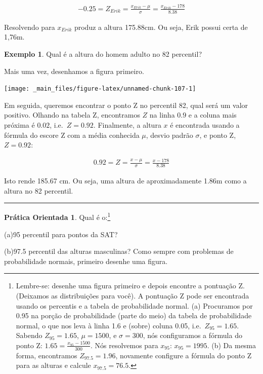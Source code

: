 \documentclass[
]{book}
\theoremstyle{definition}
\theoremstyle{definition}
\newtheorem{example}{Exemplo}[chapter]
\theoremstyle{definition}
\newtheorem{exercise}{Prática Orientada}[chapter]
\theoremstyle{definition}
\theoremstyle{remark}
\begin{document}
\begin{eqnarray*}
-0.25 = Z_{Erik} = \frac{x_{Erik} - \mu}{\sigma} = \frac{x_{Erik} - 178}{8.38}
\end{eqnarray*}

Resolvendo para \(x_{Erik}\) produz a altura 175.88cm. Ou seja, Erik possui certa de 1,76m.

\begin{example}
\protect\hypertarget{exm:unnamed-chunk-106}{}{\label{exm:unnamed-chunk-106} }Qual é a altura do homem adulto no 82 percentil?
\end{example}

Mais uma vez, desenhamos a figura primeiro.

\texttt{[image: \_main\_files/figure-latex/unnamed-chunk-107-1]}

Em seguida, queremos encontrar o ponto Z no percentil 82, qual será um valor positivo. Olhando na tabela Z, encontramos \(Z\) na linha \(0.9\) e a coluna mais próxima é \(0.02\), i.e.~\(Z=0.92\). Finalmente, a altura \(x\) é encontrada usando a fórmula do escore Z com a média conhecida \(\mu\), desvio padrão \(\sigma\), e ponto Z, \(Z=0.92\):

\begin{eqnarray*}
0.92 = Z = \frac{x-\mu}{\sigma} = \frac{x - 178}{8.38}
\end{eqnarray*}

Isto rende 185.67 cm. Ou seja, uma altura de aproximadamente 1.86m como a altura no 82 percentil.

\begin{center}\rule{0.5\linewidth}{0.5pt}\end{center}

\begin{exercise}
\protect\hypertarget{exr:unnamed-chunk-109}{}{\label{exr:unnamed-chunk-109} }
Qual é o:\footnote{Lembre-se: desenhe uma figura primeiro e depois encontre a pontuação Z. (Deixamos as distribuições para você). A pontuação Z pode ser encontrada usando os percentis e a tabela de probabilidade normal. (a) Procuramos por 0.95 na porção de probabilidade (parte do meio) da tabela de probabilidade normal, o que nos leva à linha 1.6 e (sobre) coluna 0.05, i.e.~\(Z_{95}=1.65\). Sabendo \(Z_{95}=1.65\), \(\mu = 1500\), e \(\sigma = 300\), nós configuramos a fórmula do ponto Z: \(1.65 = \frac{x_{95} - 1500}{300}\). Nós resolvemos para \(x_{95}\): \(x_{95} = 1995\). (b) Da mesma forma, encontramos \(Z_{97.5} = 1.96\), novamente configure a fórmula do ponto Z para as alturas e calcule \(x_{97.5} = 76.5\).}

(a)95 percentil para pontos da SAT?

(b)97.5 percentil das alturas masculinas? Como sempre com problemas de probabilidade normais, primeiro desenhe uma figura.
\end{exercise}
\end{document}

